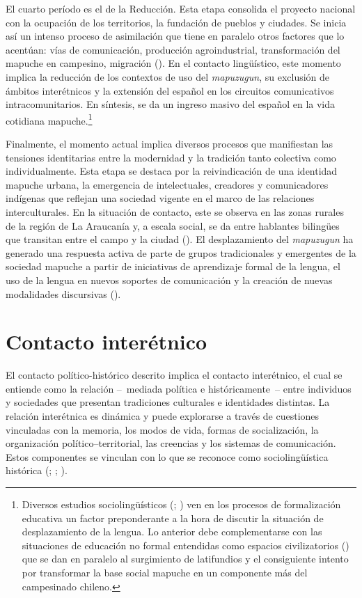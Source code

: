 \documentclass[output=paper]{../langscibook}
\begin{document}
El cuarto período es el de la Reducción. Esta etapa consolida el proyecto nacional con la ocupación de los territorios, la fundación de pueblos y ciudades. Se inicia así un intenso proceso de asimilación que tiene en paralelo otros factores que lo acentúan: vías de comunicación, producción agroindustrial, transformación del mapuche en campesino, migración (\citealt{ComunidaddeHistoriaMapuche2015}). En el contacto lingüístico, este momento implica la reducción de los contextos de uso del \textit{mapuzugun}, su exclusión de ámbitos interétnicos y la extensión del español en los circuitos comunicativos intracomunitarios. En síntesis, se da un ingreso masivo del español en la vida cotidiana mapuche.\footnote{Diversos estudios sociolingüísticos (\citealt{DuránRamos1998}; \citealt{LagosEspinoza2013}) ven en los procesos de formalización educativa un factor preponderante a la hora de discutir la situación de desplazamiento de la lengua. Lo anterior debe complementarse con las situaciones de educación no formal entendidas como espacios civilizatorios (\citealt{NahuelpánMoreno2012}) que se dan en paralelo al surgimiento de latifundios y el consiguiente intento por transformar la base social mapuche en un componente más del campesinado chileno.}

Finalmente, el momento actual implica diversos procesos que manifiestan las tensiones identitarias entre la modernidad y la tradición tanto colectiva como individualmente. Esta etapa se destaca por la reivindicación de una identidad mapuche urbana, la emergencia de intelectuales, creadores y comunicadores indígenas que reflejan una sociedad vigente en el marco de las relaciones interculturales. En la situación de contacto, este se observa en las zonas rurales de la región de La Araucanía y, a escala social, se da entre hablantes bilingües que transitan entre el campo y la ciudad (\citealt{WittigGonzálezOlateVinet2016}). El desplazamiento del \textit{mapuzugun} ha generado una respuesta activa de parte de grupos tradicionales y emergentes de la sociedad mapuche a partir de iniciativas de aprendizaje formal de la lengua, el uso de la lengua en nuevos soportes de comunicación y la creación de nuevas modalidades discursivas (\citealt{OlateVinetWittigGonzález2019}).


\section{Contacto interétnico}\label{sec:olate:3}


El contacto político-histórico descrito implica el contacto interétnico, el cual se entiende como la relación -- mediada política e históricamente -- entre individuos y sociedades que presentan tradiciones culturales e identidades distintas. La relación interétnica es dinámica y puede explorarse a través de cuestiones vinculadas con la memoria, los modos de vida, formas de socialización, la organización político--territorial, las creencias y los sistemas de comunicación. Estos componentes se vinculan con lo que se reconoce como sociolingüística histórica (\citealt{HernándezCampoyCondeSilvestre2012};  \citealt{McCollMillar2012}; \citealt{Crow2015}).
\end{document}
